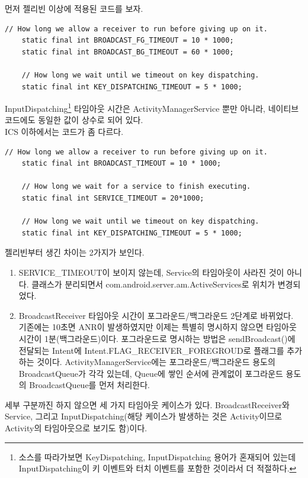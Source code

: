 먼저 젤리빈 이상에 적용된 코드를 보자.
\begin{lstlisting}[frame=single] 
	// How long we allow a receiver to run before giving up on it.
	static final int BROADCAST_FG_TIMEOUT = 10 * 1000;
	static final int BROADCAST_BG_TIMEOUT = 60 * 1000;

	// How long we wait until we timeout on key dispatching.
	static final int KEY_DISPATCHING_TIMEOUT = 5 * 1000;
\end{lstlisting}
InputDispatching\footnote{소스를 따라가보면 KeyDispatching, InputDispatching 용어가 혼재되어 있는데 InputDispatching이 키 이벤트와 터치 이벤트를 포함한 것이라서 더 적절하다.} 타임아웃 시간은 ActivityManagerService 뿐만 아니라, 네이티브 코드에도 동일한 값이 상수로 되어 있다.\\

ICS 이하에서는 코드가 좀 다르다.
\begin{lstlisting}[frame=single] 
	// How long we allow a receiver to run before giving up on it.
	static final int BROADCAST_TIMEOUT = 10 * 1000;

	// How long we wait for a service to finish executing.
	static final int SERVICE_TIMEOUT = 20*1000;

	// How long we wait until we timeout on key dispatching.
	static final int KEY_DISPATCHING_TIMEOUT = 5 * 1000;
\end{lstlisting}

젤리빈부터 생긴 차이는 2가지가 보인다.
\begin{enumerate}
\item  SERVICE\_TIMEOUT이 보이지 않는데, Service의 타임아웃이 사라진 것이 아니다. 클래스가 분리되면서 com.android.server.am.ActiveServices로 위치가 변경되었다.
\item BroadcastReceiver 타임아웃 시간이 포그라운드/백그라운드 2단계로 바뀌었다. 기존에는 10초면 ANR이 발생하였지만 이제는 특별히 명시하지 않으면 타임아웃 시간이 1분(백그라운드)이다. 포그라운드로 명시하는 방법은 sendBroadcast()에 전달되는 Intent에 Intent.FLAG\_RECEIVER\_FOREGROUD로 플래그를 추가하는 것이다.
ActivityManagerService에는 포그라운드/백그라운드 용도의 BroadcastQueue가 각각 있는데, Queue에 쌓인 순서에 관계없이 포그라운드 용도의 BroadcastQueue를 먼저 처리한다.
\end{enumerate}

세부 구분까진 하지 않으면 세 가지 타임아웃 케이스가 있다. BroadcastReceiver와 Service, 그리고 InputDispatching(해당 케이스가 발생하는 것은 Activity이므로 Activity의 타임아웃으로 보기도 함)이다.\\

